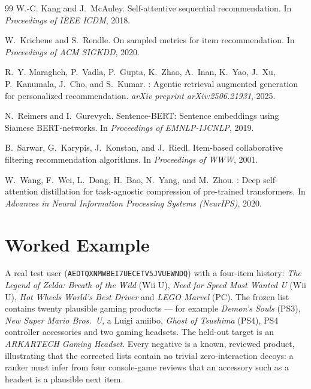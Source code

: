 \documentclass[11pt,a4paper]{article}
\begin{document}
\begin{thebibliography}{99}
W.-C. Kang and J.~McAuley.
\newblock Self-attentive sequential recommendation.
\newblock In \emph{Proceedings of IEEE ICDM}, 2018.

W.~Krichene and S.~Rendle.
\newblock On sampled metrics for item recommendation.
\newblock In \emph{Proceedings of ACM SIGKDD}, 2020.

R.~Y. Maragheh, P.~Vadla, P.~Gupta, K.~Zhao, A.~Inan, K.~Yao, J.~Xu, P.~Kanumala, J.~Cho, and S.~Kumar.
: Agentic retrieval augmented generation for personalized recommendation.
\newblock \emph{arXiv preprint arXiv:2506.21931}, 2025.

N.~Reimers and I.~Gurevych.
\newblock Sentence-{BERT}: Sentence embeddings using {S}iamese {BERT}-networks.
\newblock In \emph{Proceedings of EMNLP-IJCNLP}, 2019.

B.~Sarwar, G.~Karypis, J.~Konstan, and J.~Riedl.
\newblock Item-based collaborative filtering recommendation algorithms.
\newblock In \emph{Proceedings of WWW}, 2001.

W.~Wang, F.~Wei, L.~Dong, H.~Bao, N.~Yang, and M.~Zhou.
: Deep self-attention distillation for task-agnostic compression of pre-trained transformers.
\newblock In \emph{Advances in Neural Information Processing Systems (NeurIPS)}, 2020.

\end{thebibliography}

\appendix

\section{Worked Example}
\label{app:example}

A real test user (\texttt{AEDTQXNMWBEI7UECETV5JVUEWNDQ}) with a four-item history: \textit{The
Legend of Zelda: Breath of the Wild} (Wii U), \textit{Need for Speed Most Wanted U} (Wii U),
\textit{Hot Wheels World's Best Driver} and \textit{LEGO Marvel} (PC). The frozen list contains
twenty plausible gaming products --- for example \textit{Demon's Souls} (PS3), \textit{New Super
Mario Bros.\ U}, a Luigi amiibo, \textit{Ghost of Tsushima} (PS4), PS4 controller accessories and
two gaming headsets. The held-out target is an \textit{ARKARTECH Gaming Headset}. Every
negative is a known, reviewed product, illustrating that the corrected lists contain no trivial
zero-interaction decoys: a ranker must infer from four console-game reviews that an accessory
such as a headset is a plausible next item.
\end{document}
